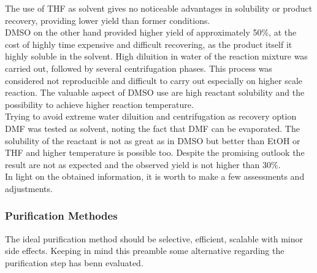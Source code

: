 \documentclass[../Master.tex]{subfiles}
\begin{document}
The use of THF as solvent gives no noticeable advantages in solubility or product recovery, providing lower yield than former conditions.\\
DMSO on the other hand provided higher yield of approximately 50\%, at the cost of highly time expensive and difficult recovering, as the product itself it highly soluble in the solvent. High diluition in water of the reaction mixture was carried out, followed by several centrifugation phases. This process was considered not reproducible and difficult to carry out especially on higher scale reaction. The valuable aspect of DMSO use are high reactant solubility and the possibility to achieve higher reaction temperature.\\
Trying to avoid extreme water diluition and centrifugation as recovery option DMF was tested as solvent, noting the fact that DMF can be evaporated. The solubility of the reactant is not as great as in DMSO but better than EtOH or THF and higher temperature is possible too. Despite the promising outlook the result are not as expected and the observed yield is not higher than 30\%.\\
In light on the obtained information, it is worth to make a few assessments and adjustments.

\subsubsection{Purification Methodes}\label{sec:pyr-purification}

The ideal purification method should be selective, efficient, scalable with minor side effects. Keeping in mind this preamble some alternative regarding the purification step has benn evaluated.
\end{document}
